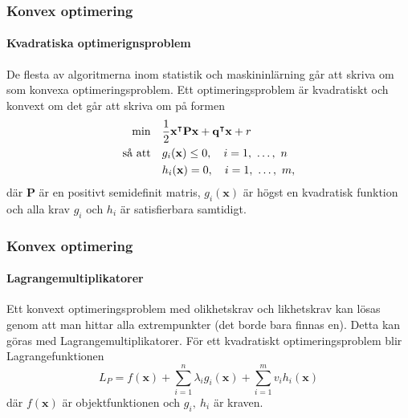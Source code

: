 \documentclass{beamer}
\theoremstyle{definition}
\theoremstyle{remark}
\newcommand{\bfx}{\mathbf{x}}
\begin{document}
\begin{frame}
	\frametitle{Konvex optimering}
	\framesubtitle{Kvadratiska optimerignsproblem}
	De flesta av algoritmerna inom statistik och maskininlärning går att skriva om som konvexa optimeringsproblem.
	Ett optimeringsproblem är kvadratiskt och konvext om det går att skriva om på formen
	\begin{equation*}
	\begin{aligned}
	\operatornamewithlimits{min}& & &\frac{1}{2}\bfx^\intercal\mathbf{P}\bfx+\mathbf{q}^\intercal\bfx + r\\
	\text{så att}& & &g_i(\bfx)\leq0,\quad i=1,~\dots,~n\\
	& & &h_i(\bfx)=0,\quad i=1,~\dots,~m,\\
	\end{aligned}
	\end{equation*}
	där $\mathbf{P}$ är en positivt semidefinit matris, $g_i(\bfx)$ är högst en kvadratisk funktion och alla krav $g_i$ och $h_i$ är satisfierbara samtidigt.
\end{frame}

\begin{frame}
	\frametitle{Konvex optimering}
	\framesubtitle{Lagrangemultiplikatorer}
	Ett konvext optimeringsproblem med olikhetskrav och likhetskrav kan lösas genom att man hittar alla extrempunkter (det borde bara finnas en). Detta kan göras med Lagrangemultiplikatorer. För ett kvadratiskt optimeringsproblem blir Lagrangefunktionen
	\begin{equation*}
		L_P=f(\bfx) + \sum_{i=1}^{n}\lambda_ig_i(\bfx)+\sum_{i=1}^{m}v_ih_i(\bfx)
	\end{equation*}
	där $f(\bfx)$ är objektfunktionen och $g_i,~h_i$ är kraven.
\end{frame}
\end{document}
